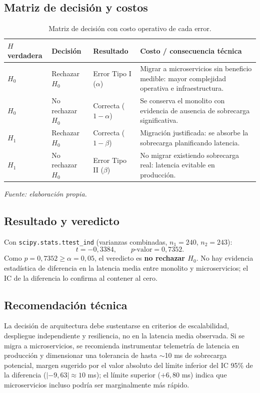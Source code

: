 \documentclass[12pt,a4paper]{article}
\newcommand{\fuentep}{\par\vspace{2pt}\footnotesize\textit{Fuente: elaboración propia.}\par}
\begin{document}
\subsection{Matriz de decisión y costos}
\begin{table}[htbp]
\centering
\caption{Matriz de decisión con costo operativo de cada error.}
\small
\begin{tabular}{>{\raggedright\arraybackslash}p{3.2cm}>{\raggedright\arraybackslash}p{2.6cm}>{\raggedright\arraybackslash}p{2.4cm}>{\raggedright\arraybackslash}p{5.2cm}}
\toprule
$H$ verdadera & Decisión & Resultado & Costo / consecuencia técnica \\
\midrule
$H_0$ & Rechazar $H_0$ & Error Tipo I ($\alpha$) & Migrar a microservicios sin beneficio medible: mayor complejidad operativa e infraestructura. \\
$H_0$ & No rechazar $H_0$ & Correcta ($1-\alpha$) & Se conserva el monolito con evidencia de ausencia de sobrecarga significativa. \\
$H_1$ & Rechazar $H_0$ & Correcta ($1-\beta$) & Migración justificada: se absorbe la sobrecarga planificando latencia. \\
$H_1$ & No rechazar $H_0$ & Error Tipo II ($\beta$) & No migrar existiendo sobrecarga real: latencia evitable en producción. \\
\bottomrule
\end{tabular}
\fuentep
\end{table}

\subsection{Resultado y veredicto}
Con \texttt{scipy.stats.ttest\_ind} (varianzas combinadas, $n_1=240$, $n_2=243$):
\[
t = -0{,}3384, \qquad p\text{-valor} = 0{,}7352.
\]
Como $p = 0{,}7352 \geq \alpha = 0{,}05$, el veredicto es \textbf{no rechazar $H_0$}. No hay evidencia estadística de diferencia en la latencia media entre monolito y microservicios; el IC de la diferencia lo confirma al contener al cero.

\subsection{Recomendación técnica}
La decisión de arquitectura debe sustentarse en criterios de escalabilidad, despliegue independiente y resiliencia, no en la latencia media observada. Si se migra a microservicios, se recomienda instrumentar telemetría de latencia en producción y dimensionar una tolerancia de hasta $\sim$10 ms de sobrecarga potencial, margen sugerido por el valor absoluto del límite inferior del IC 95\% de la diferencia ($|-9{,}63|\approx10$ ms); el límite superior ($+6{,}80$ ms) indica que microservicios incluso podría ser marginalmente más rápido.
\end{document}
